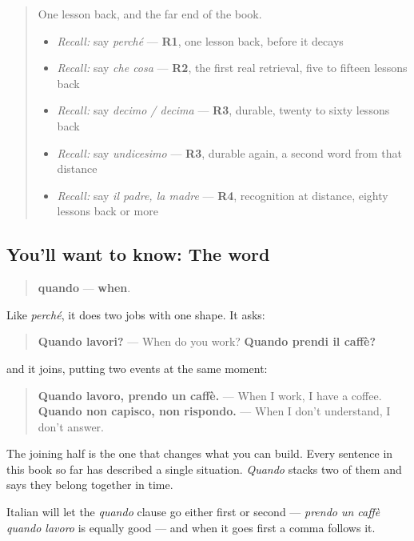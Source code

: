 \begin{quote}
One lesson back, and the far end of the book.

\begin{itemize}
\raggedright
  \item \emph{Recall:} say \emph{perché} — \textbf{R1}, one lesson back, before it decays
  \item \emph{Recall:} say \emph{che cosa} — \textbf{R2}, the first real retrieval, five to fifteen lessons back
  \item \emph{Recall:} say \emph{decimo / decima} — \textbf{R3}, durable, twenty to sixty lessons back
  \item \emph{Recall:} say \emph{undicesimo} — \textbf{R3}, durable again, a second word from that distance
  \item \emph{Recall:} say \emph{il padre, la madre} — \textbf{R4}, recognition at distance, eighty lessons back or more
\end{itemize}
\end{quote}

\subsection*{You'll want to know: The word}
\begin{quote}
\textbf{quando} — \textbf{when}.
\end{quote}

Like \emph{perché}, it does two jobs with one shape. It asks:

\begin{quote}
\textbf{Quando lavori?} — When do you work? \textbf{Quando prendi il caffè?}
\end{quote}

and it joins, putting two events at the same moment:

\begin{quote}
\textbf{Quando lavoro, prendo un caffè.} — When I work, I have a coffee. \textbf{Quando non capisco, non rispondo.} — When I don't understand, I don't answer.
\end{quote}

The joining half is the one that changes what you can build. Every sentence in this book so far has described a single situation. \emph{Quando} stacks two of them and says they belong together in time.

Italian will let the \emph{quando} clause go either first or second — \emph{prendo un caffè quando lavoro} is equally good — and when it goes first a comma follows it.

